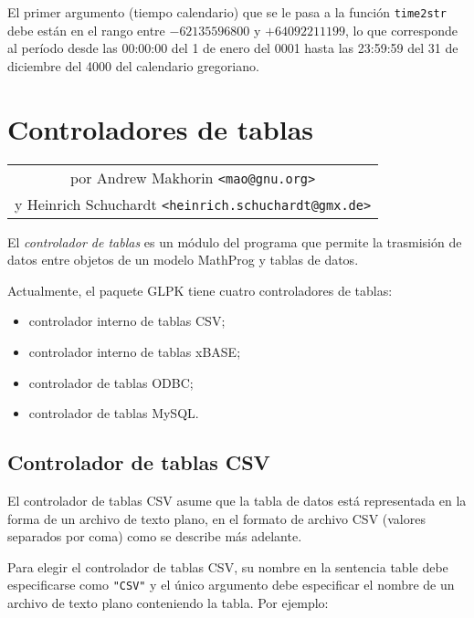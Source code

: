 \documentclass[11pt,spanish]{report}
\begin{document}
El primer argumento (tiempo calendario) que se le pasa a la función {\tt time2str} debe están en el rango entre $-62135596800$ y $+64092211199$, lo que corresponde al período desde las 00:00:00 del 1 de enero del 0001 hasta las 23:59:59 del 31 de diciembre del 4000 del calendario gregoriano.


\chapter{Controladores de tablas}
\label{drivers}

\noindent\hfil
\begin{tabular}{c}
por Andrew Makhorin \verb|<mao@gnu.org>|\\
y Heinrich Schuchardt \verb|<heinrich.schuchardt@gmx.de>|\\
\end{tabular}

\bigskip\bigskip

El {\it controlador de tablas} es un módulo del programa que permite la trasmisión de datos entre objetos de un modelo MathProg y tablas de datos.

Actualmente, el paquete GLPK tiene cuatro controladores de tablas:

\vspace*{-8pt}

\begin{itemize}
\item controlador interno de tablas CSV;
\item controlador interno de tablas xBASE;
\item controlador de tablas ODBC;
\item controlador de tablas MySQL.
\end{itemize}

\vspace*{-8pt}

\section{Controlador de tablas CSV}

El controlador de tablas CSV asume que la tabla de datos está representada en la forma de un archivo de texto plano, en el formato de archivo CSV (valores separados por coma) como se describe más adelante.

Para elegir el controlador de tablas CSV, su nombre en la sentencia table debe especificarse como \verb|"CSV"| y el único argumento debe especificar el nombre de un archivo de texto plano conteniendo la tabla. Por ejemplo:
\end{document}
